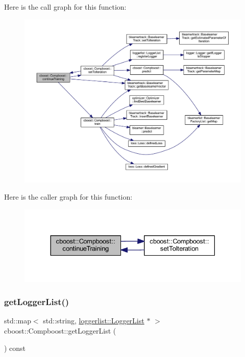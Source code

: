 Here is the call graph for this function\+:
\nopagebreak
\begin{figure}[H]
\begin{center}
\leavevmode
\includegraphics[width=350pt]{classcboost_1_1_compboost_a191aa22dbfcc3d2e878ef75c0b196d07_cgraph}
\end{center}
\end{figure}
Here is the caller graph for this function\+:
\nopagebreak
\begin{figure}[H]
\begin{center}
\leavevmode
\includegraphics[width=330pt]{classcboost_1_1_compboost_a191aa22dbfcc3d2e878ef75c0b196d07_icgraph}
\end{center}
\end{figure}
\mbox{\label{classcboost_1_1_compboost_a0376256bdfde1a50b420ad7412f4b4dd}} 
\subsubsection{\texorpdfstring{get\+Logger\+List()}{getLoggerList()}}
{\footnotesize\ttfamily std\+::map$<$ std\+::string, \mbox{\hyperlink{classloggerlist_1_1_logger_list}{loggerlist\+::\+Logger\+List}} $\ast$ $>$ cboost\+::\+Compboost\+::get\+Logger\+List (\begin{DoxyParamCaption}{ }\end{DoxyParamCaption}) const}


